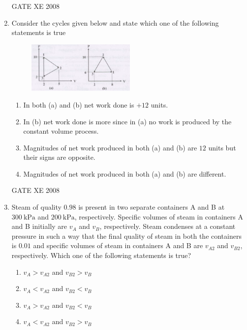 \documentclass[12pt]{article}
\begin{document}
\begin{enumerate}[label=Q\arabic*.]
GATE XE 2008

\item Consider the cycles given below and state which one of the following statements is true

    \begin{figure}[H]
    \centering
    \includegraphics[width=0.5\textwidth]{figs/ass1_g_q13.png}
    \caption{}
    \end{figure}

\begin{enumerate}[label=(\Alph*)]
\item  In both (a) and (b) net work done is $+12$ units.
\item  In (b) net work done is more since in (a) no work is produced by the constant volume process.
\item  Magnitudes of net work produced in both (a) and (b) are $12$ units but their signs are opposite.
\item  Magnitudes of net work produced in both (a) and (b) are different.  
\end{enumerate}

GATE XE 2008

\item Steam of quality $0.98$ is present in two separate containers A and B at $300\ \mathrm{kPa}$ and $200\ \mathrm{kPa}$, respectively. Specific volumes of steam in containers A and B initially are $v_A$ and $v_B$, respectively. Steam condenses at a constant pressure in such a way that the final quality of steam in both the containers is $0.01$ and specific volumes of steam in containers A and B are $v_{A2}$ and $v_{B2}$, respectively. Which one of the following statements is true?  

\begin{enumerate}[label=(\Alph*)]
\item  $v_A > v_{A2}$ and $v_{B2} > v_B$  
\item  $v_A < v_{A2}$ and $v_{B2} < v_B$  
\item  $v_A > v_{A2}$ and $v_{B2} < v_B$  
\item  $v_A < v_{A2}$ and $v_{B2} > v_B$  
\end{enumerate}


\end{enumerate}
\end{document}
